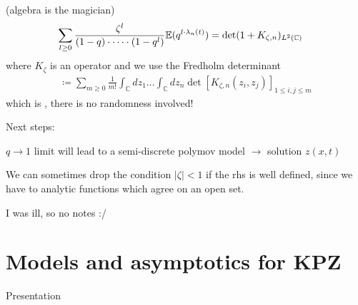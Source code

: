  (algebra is the magician)
\begin{align*}
    \sum_{l\geq 0}\frac{\zeta^l}{(1-q)\cdot\dots\cdot (1-q^l)}\mathbb{E}(q^{l\cdot \lambda_n(t)})&=\det(1+K_{\zeta,n})_{L^2(\mathbb{C})}
\end{align*}
where $K_\zeta$ is an operator and we use the Fredholm determinant
\begin{align*}
    \coloneqq \sum_{m\geq 0}\frac{1}{m!}\int_{\mathbb{C}}dz_1\dots\int_{\mathbb{C}}d z_n\det[K_{\zeta,n}(z_i,z_j)]_{1\leq i,j\leq m}
\end{align*}
which is , there is no randomness involved!

Next steps:

$q\to 1$ limit will lead to a semi-discrete polymov model $\to$ solution $z(x,t)$


\begin{aremark}
    We can sometimes drop the condition $|\zeta|<1$ if the rhs is well defined, since we have to analytic functions which agree on an open set.
\end{aremark}

I was ill, so no notes :/
\newpage
{}
\section{Models and asymptotics for KPZ}
Presentation


